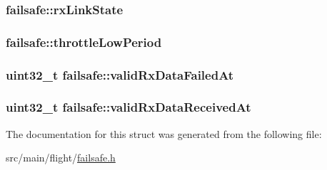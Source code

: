 \hypertarget{structfailsafe_a3e6c21f8fb7c3eccad8e5c6063fc6b2d}{
\subsubsection[{rx\+Link\+State}]{ failsafe\+::rx\+Link\+State}}\label{structfailsafe_a3e6c21f8fb7c3eccad8e5c6063fc6b2d}
\hypertarget{structfailsafe_ac476e200aabbbd5ea074c861a766214c}{
\subsubsection[{throttle\+Low\+Period}]{ failsafe\+::throttle\+Low\+Period}}\label{structfailsafe_ac476e200aabbbd5ea074c861a766214c}
\hypertarget{structfailsafe_ad4a10974833eccd3d7ffc88f5df60217}{
\subsubsection[{valid\+Rx\+Data\+Failed\+At}]{\setlength{\rightskip}{0pt plus 5cm}uint32\+\_\+t failsafe\+::valid\+Rx\+Data\+Failed\+At}}\label{structfailsafe_ad4a10974833eccd3d7ffc88f5df60217}
\hypertarget{structfailsafe_a2697d9428c0ffc03a2eab4c664253e89}{
\subsubsection[{valid\+Rx\+Data\+Received\+At}]{\setlength{\rightskip}{0pt plus 5cm}uint32\+\_\+t failsafe\+::valid\+Rx\+Data\+Received\+At}}\label{structfailsafe_a2697d9428c0ffc03a2eab4c664253e89}


The documentation for this struct was generated from the following file\+:\begin{DoxyCompactItemize}
\item 
src/main/flight/\hyperlink{flight_2failsafe_8h}{failsafe.\+h}\end{DoxyCompactItemize}
